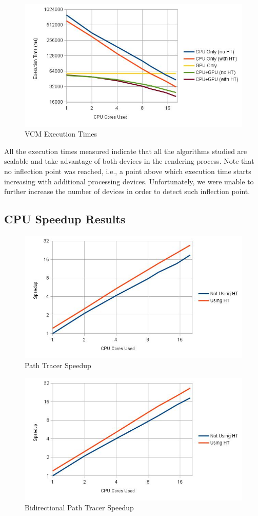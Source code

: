 \begin{figure}[H]
\centering
\includegraphics[width=0.8\linewidth]{img/vcmTexec.jpg}
\caption{\label{img:vcmTexec} VCM Execution Times}
\end{figure}

All the execution times measured indicate that all the algorithms studied are scalable and take advantage of both devices in the rendering process. Note that no inflection point was reached, i.e., a point above which execution time starts increasing with additional processing devices. Unfortunately, we were unable to further increase the number of devices in order to detect such inflection point.

\subsection{CPU Speedup Results}

\begin{figure}[H]
\centering
\includegraphics[width=0.8\linewidth]{img/ptSpeedup.jpg}
\caption{\label{img:ptSpeedup} Path Tracer Speedup}
\end{figure}

\begin{figure}[H]
\centering
\includegraphics[width=0.8\linewidth]{img/bptSpeedup.jpg}
\caption{\label{img:bptSpeedup} Bidirectional Path Tracer Speedup}
\end{figure}

